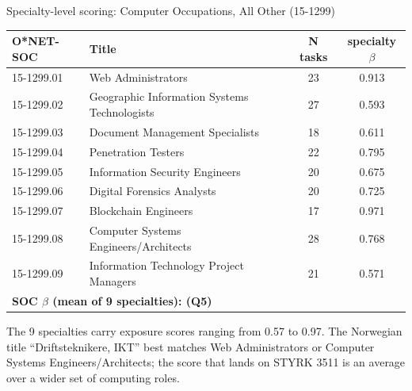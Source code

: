 \begin{frame}{Specialty-level scoring: Computer Occupations, All Other (15-1299)}
\centering\small
\setlength{\tabcolsep}{6pt}
\renewcommand{\arraystretch}{1.05}
\begin{tabular}{lp{5.5cm}cc}
\toprule
O*NET-SOC & Title & N tasks & specialty $\beta$ \\
\midrule
15-1299.01 & Web Administrators                            & 23 & 0.913 \\
15-1299.02 & Geographic Information Systems Technologists  & 27 & 0.593 \\
15-1299.03 & Document Management Specialists               & 18 & 0.611 \\
15-1299.04 & Penetration Testers                           & 22 & 0.795 \\
15-1299.05 & Information Security Engineers                & 20 & 0.675 \\
15-1299.06 & Digital Forensics Analysts                    & 20 & 0.725 \\
15-1299.07 & Blockchain Engineers                          & 17 & 0.971 \\
15-1299.08 & Computer Systems Engineers/Architects         & 28 & 0.768 \\
15-1299.09 & Information Technology Project Managers       & 21 & 0.571 \\
\midrule
\multicolumn{4}{l}{\textbf{SOC $\beta$ (mean of 9 specialties): \;0.736 (Q5)}} \\
\bottomrule
\end{tabular}

\vspace{0.7em}
\footnotesize
The 9 specialties carry exposure scores ranging from 0.57 to 0.97. The Norwegian title ``Driftsteknikere, IKT'' best matches Web Administrators or Computer Systems Engineers/Architects; the score that lands on STYRK 3511 is an average over a wider set of computing roles.
\end{frame}
